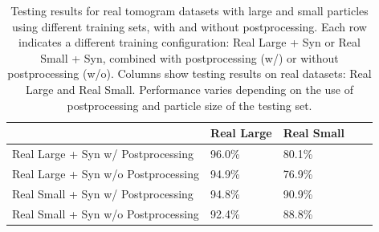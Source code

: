 \documentclass[preprint,12pt]{elsarticle}
\begin{document}
\begin{table}[]
    \center
    \begin{tabular}{|l|l|l|l|l|}
    \hline
                                        & Real Large & Real Small \\ \hline%
    Real Large + Syn w/ Postprocessing  & 96.0\%     & 80.1\%               \\ \hline%
    Real Large + Syn w/o Postprocessing & 94.9\%     & 76.9\%               \\ \hline%
    Real Small + Syn w/  Postprocessing & 94.8\%     & 90.9\%               \\ \hline%
    Real Small + Syn w/o Postprocessing & 92.4\%     & 88.8\%               \\ \hline%
    \end{tabular}
    \caption{Testing results for real tomogram datasets with large and small particles using different training sets, with and without postprocessing. Each row indicates a different training configuration: Real Large + Syn or Real Small + Syn, combined with postprocessing (w/) or without postprocessing (w/o). Columns show testing results on real datasets: Real Large and Real Small. Performance varies depending on the use of postprocessing and particle size of the testing set.}
    \label{tab:res2}
\end{table}
\end{document}
